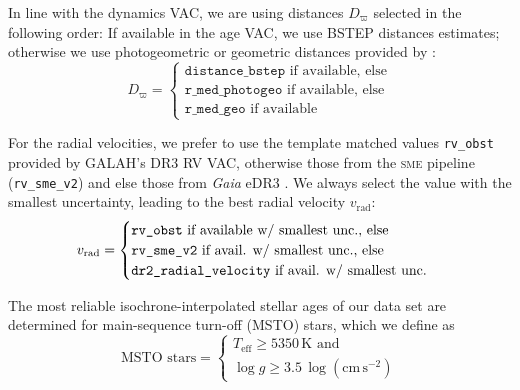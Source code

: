 \documentclass[fleqn,usenatbib]{mnras}
\newcommand{\Gaia}{\textit{Gaia}\xspace} %
\begin{document}
In line with the dynamics VAC, we are using distances $D_\varpi$ selected in the following order: If available in the age VAC, we use BSTEP distances estimates; otherwise we use photogeometric or geometric distances provided by \citep{BailerJones2021}:
\begin{equation} \label{eq:best_distance}
D_\varpi =
\begin{cases}
\texttt{distance\_bstep} \text{ if available, else} \\
\texttt{r\_med\_photogeo} \text{ if available, else} \\
\texttt{r\_med\_geo} \text{ if available}
\end{cases}
\end{equation}

For the radial velocities, we prefer to use the template matched values \texttt{rv\_obst} provided by GALAH's DR3 RV VAC, otherwise those from the \textsc{sme} pipeline (\texttt{rv\_sme\_v2}) and else those from \Gaia eDR3 \citep{Katz2019}. We always select the value with the smallest uncertainty, leading to the best radial velocity $v_\text{rad}$:
\begin{equation} \label{eq:best_rv}
\centering
v_\text{rad} =
\begin{cases}
\texttt{rv\_obst} \text{ if available w/ smallest unc., else} \\
\texttt{rv\_sme\_v2} \text{ if avail. w/ smallest unc., else} \\
\texttt{dr2\_radial\_velocity} \text{ if avail. w/ smallest unc.}
\end{cases}
\end{equation}

The most reliable isochrone-interpolated stellar ages of our data set are determined for main-sequence turn-off (MSTO) stars, which we define as
\begin{equation} \label{eq:msto}
\text{MSTO stars} = 
\begin{cases}
T_\text{eff} \geq 5350\,\mathrm{K} \text{ and} \\
\log g \geq 3.5\,\mathrm{\log \left(cm\,s^{-2} \right)} 
\end{cases}
\end{equation}
\end{document}
